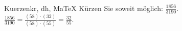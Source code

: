 \begin{MAufgabe}{Kuerzen}{kr, dh, MaTeX}
K\"urzen Sie soweit m\"oglich: $\frac{1856}{3190}$.\\ 
\ifLsg\MLoesung
\quad $\frac{1856}{3190}=\frac{(58)\cdot(32)}{(58)\cdot(55)}=\frac{32}{55}$.\else\relax\fi
 \end{MAufgabe}